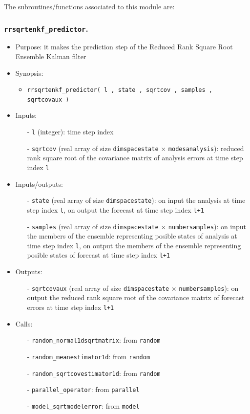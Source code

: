 \documentclass[12pt]{article}
\begin{document}
The subroutines/functions associated to this module are:

\subsubsection{{\tt rrsqrtenkf\_predictor}.}
\begin{itemize}
\item Purpose: it makes the prediction step of the Reduced Rank Square Root Ensemble Kalman filter
\item Synopsis: 
\begin{itemize}
\item {\tt rrsqrtenkf\_predictor( l , state , sqrtcov , samples , sqrtcovaux )} 
\end{itemize}
\item Inputs: 
\begin{itemize}
\item[-] {\tt l} (integer): time step index
\item[-] {\tt sqrtcov} (real array of size {\tt dimspacestate} $\times$ {\tt modesanalysis}): reduced rank square root of the covariance matrix of analysis errors at time step index {\tt l}
\end{itemize}
\item Inputs/outputs: 
\begin{itemize}
\item[-] {\tt state} (real array of size {\tt dimspacestate}): on input the analysis at time step index {\tt l}, on output the forecast at time step index {\tt l+1}
\item[-] {\tt samples} (real array of size {\tt dimspacestate} $\times$ {\tt numbersamples}): on input the members of the ensemble representing posible states of analysis at time step index {\tt l}, on output the members of the ensemble representing posible states of forecast at time step index {\tt l+1}
\end{itemize}
\item Outputs: 
\begin{itemize}
\item[-] {\tt sqrtcovaux} (real array of size {\tt dimspacestate} $\times$ {\tt numbersamples}): on output the reduced rank square root of the covariance matrix of forecast errors at time step index {\tt l+1}
\end{itemize}
\item Calls: 
\begin{itemize}
\item[-] {\tt random\_normal1dsqrtmatrix}: from {\tt random}
\item[-] {\tt random\_meanestimator1d}: from {\tt random} 
\item[-] {\tt random\_sqrtcovestimator1d}: from {\tt random} 
\item[-] {\tt parallel\_operator}: from {\tt parallel}
\item[-] {\tt model\_sqrtmodelerror}: from {\tt model}
\end{itemize}
\end{itemize} 
\end{document}
